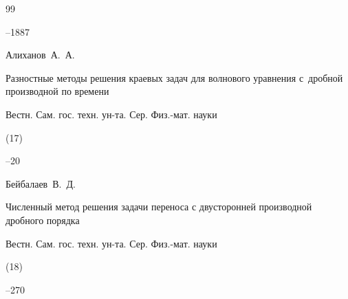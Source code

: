 \begin{thebibliography}{99}

--1887
















\by Алиханов~А.~А.

\paper Разностные методы решения краевых задач для волнового уравнения с~дробной производной по времени

\jour Вестн. Сам. гос. техн. ун-та. Сер. Физ.-мат. науки


(17)

--20






\by Бейбалаев~В.~Д. 

\paper Численный метод решения  задачи переноса с двусторонней производной дробного порядка

\jour Вестн. Сам. гос. техн. ун-та. Сер. Физ.-мат. науки


(18)

--270






\end{thebibliography}

